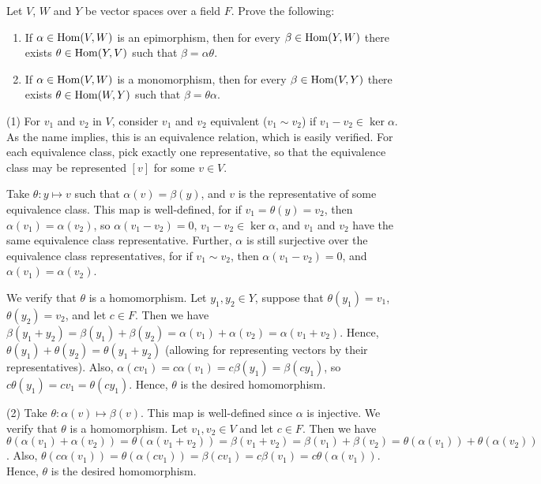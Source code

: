 \begin{problem}[Golan 293 \& 294]
Let $V$, $W$ and $Y$ be vector spaces over a field $F$. Prove the following:

\begin{enumerate}
\item  
If $\alpha \in \operatorname{Hom}(V,W)$ is an epimorphism, then for every 
$\beta \in \operatorname{Hom}(Y,W)$ there exists $\theta \in \operatorname{Hom}(Y,V)$ such that $\beta = \alpha \theta$.
\item  If $\alpha \in \operatorname{Hom}(V, W)$ is a monomorphism, then 
 for every $\beta \in \operatorname{Hom}(V,Y)$ there exists $\theta \in \operatorname{Hom}(W,Y)$ such that $\beta = \theta \alpha$.
\end{enumerate}


\end{problem}
\smallskip
\begin{solution}
(1) For $v_1$ and $v_2$ in $V$, consider $v_1$ and $v_2$ equivalent ($v_1\sim v_2$) if $v_1-v_2\in\ker\alpha$.  As the name implies, this is an equivalence relation, which is easily verified.  For each equivalence class, pick exactly one representative, so that the equivalence class may be represented $[v]$ for some $v\in V$. 

Take $\theta:y\mapsto v$ such that $\alpha(v) = \beta(y)$, and $v$ is the representative of some equivalence class.  This map is well-defined, for if $v_1 = \theta(y) = v_2$, then $\alpha(v_1) = \alpha(v_2)$, so $\alpha(v_1-v_2) = 0$, $v_1-v_2\in\ker\alpha$, and $v_1$ and $v_2$ have the same equivalence class representative.  Further, $\alpha$ is still surjective over the equivalence class representatives, for if $v_1\sim v_2$, then $\alpha(v_1-v_2) = 0$, and $\alpha(v_1) = \alpha(v_2)$.

We verify that $\theta$ is a homomorphism.  Let $y_1,y_2\in Y$, suppose that $\theta(y_1) = v_1$, $\theta(y_2) = v_2$, and let $c\in F$.  Then we have $\beta(y_1 + y_2) = \beta(y_1) + \beta(y_2) = \alpha(v_1) + \alpha(v_2) = \alpha(v_1 + v_2)$.  Hence, $\theta(y_1) + \theta(y_2) = \theta(y_1 + y_2)$ (allowing for representing vectors by their representatives).  Also, $\alpha(cv_1) = c\alpha(v_1) = c\beta(y_1) = \beta(cy_1)$, so $c\theta(y_1) = cv_1 = \theta(cy_1)$.  Hence, $\theta$ is the desired homomorphism.\vspace{0.2cm}

(2) Take $\theta:\alpha(v)\mapsto\beta(v)$.  This map is well-defined since $\alpha$ is injective.  We verify that $\theta$ is a homomorphism.  Let $v_1,v_2\in V$ and let $c\in F$.  Then we have $\theta(\alpha(v_1) + \alpha(v_2)) = \theta(\alpha(v_1+v_2)) = \beta(v_1+v_2) = \beta(v_1) + \beta(v_2) = \theta(\alpha(v_1))+\theta(\alpha(v_2))$. Also, $\theta(c\alpha(v_1)) = \theta(\alpha(cv_1)) = \beta(cv_1) = c\beta(v_1) = c\theta(\alpha(v_1))$. Hence, $\theta$ is the desired homomorphism. 
\end{solution}


